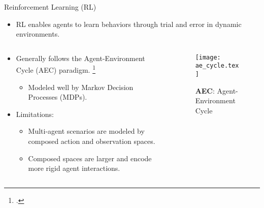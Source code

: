 \documentclass[xcolor={svgnames},aspectratio=169]{beamer}
\begin{document}
\begin{frame}{Reinforcement Learning (RL)}
    \begin{itemize}
        \item RL enables agents to learn behaviors through trial and 
            error in dynamic environments.
    \end{itemize}
    \begin{columns}
        \begin{column}{0.65\textwidth}
            \begin{itemize}
                \item Generally follows the Agent-Environment Cycle (AEC) paradigm. 
                    \footcite{sutton2018}
                \begin{itemize}
                    \item Modeled well by Markov Decision Processes (MDPs).
                \end{itemize}
                \item Limitations:
                \begin{itemize}
                    \item Multi-agent scenarios are modeled by 
                        composed action and observation spaces.
                    \item Composed spaces are larger and encode more rigid agent interactions.
                \end{itemize}
            \end{itemize}
        \end{column}
        \begin{column}{0.3\textwidth}
            \begin{figure}[!h]
                \centering
                \texttt{[image: ae\_cycle.tex]}
                \caption{\textbf{AEC}: Agent-Environment Cycle}
                \label{fig:ae_cycle}
            \end{figure}
        \end{column}
    \end{columns}
\end{frame}
\end{document}
